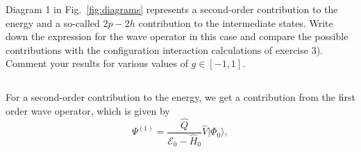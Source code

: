 Diagram 1 in Fig.~\ref{fig:diagrams} represents a second-order contribution to the energy and a so-called $2p-2h$ contribution to the intermediate states.
Write down the expression for the wave operator in this case and compare the possible contributions with the configuration interaction calculations of exercise 3). %
Comment your results for various values of $g \in [-1,1]$.

\subsection{}
For a second-order contribution to the energy, we get a contribution from the first order wave operator, which is given by
\begin{equation*}
    \Psi^{(1)} = \frac{\hat{Q}}{\mathcal{E}_0 - \hat{H}_0} \hat{V} \vert \Phi_0 \rangle,
\end{equation*}
